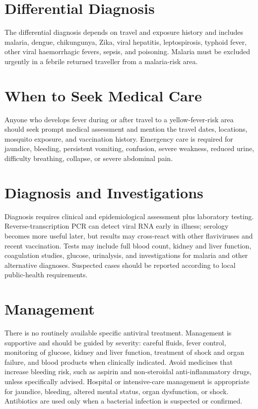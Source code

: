 \section*{Differential Diagnosis}
The differential diagnosis depends on travel and exposure history and includes malaria, dengue, chikungunya, Zika, viral hepatitis, leptospirosis, typhoid fever, other viral haemorrhagic fevers, sepsis, and poisoning. Malaria must be excluded urgently in a febrile returned traveller from a malaria-risk area.

\section*{When to Seek Medical Care}
Anyone who develops fever during or after travel to a yellow-fever-risk area should seek prompt medical assessment and mention the travel dates, locations, mosquito exposure, and vaccination history. Emergency care is required for jaundice, bleeding, persistent vomiting, confusion, severe weakness, reduced urine, difficulty breathing, collapse, or severe abdominal pain.

\section*{Diagnosis and Investigations}
Diagnosis requires clinical and epidemiological assessment plus laboratory testing. Reverse-transcription PCR can detect viral RNA early in illness; serology becomes more useful later, but results may cross-react with other flaviviruses and recent vaccination. Tests may include full blood count, kidney and liver function, coagulation studies, glucose, urinalysis, and investigations for malaria and other alternative diagnoses. Suspected cases should be reported according to local public-health requirements.

\section*{Management}
There is no routinely available specific antiviral treatment. Management is supportive and should be guided by severity: careful fluids, fever control, monitoring of glucose, kidney and liver function, treatment of shock and organ failure, and blood products when clinically indicated. Avoid medicines that increase bleeding risk, such as aspirin and non-steroidal anti-inflammatory drugs, unless specifically advised. Hospital or intensive-care management is appropriate for jaundice, bleeding, altered mental status, organ dysfunction, or shock. Antibiotics are used only when a bacterial infection is suspected or confirmed.

